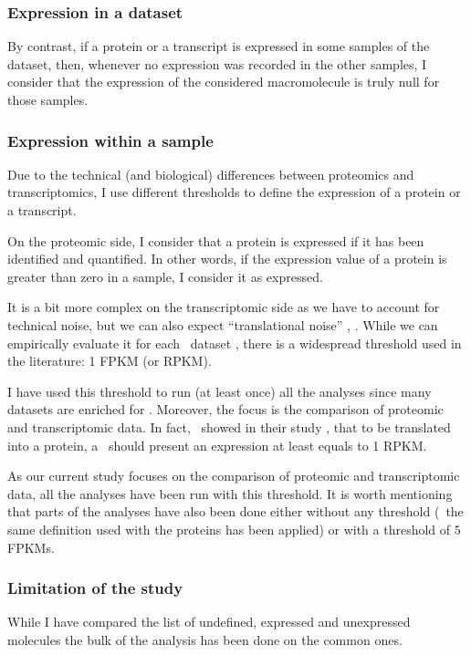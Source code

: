 \subsubsection{Expression in a dataset}
\label{subsec:ExpressedOrNot--expDataset}
By contrast, if a protein or a transcript is expressed in some samples of the
dataset, then, whenever no expression was recorded in the other
samples, I consider that the expression of the considered macromolecule is truly
null for those samples.

\subsubsection{Expression within a sample}
Due to the technical (and biological) differences between proteomics and
transcriptomics, I use different thresholds to define the expression of a protein
or a transcript.

On the proteomic side, I consider that a protein is expressed if it has been
identified and quantified. In other words, if the expression value of a protein
is greater than zero in a sample, I consider it as expressed.

\label{subsubsec:exprTrans}
It is a bit more complex on the transcriptomic side as we have to account for
technical noise, but we can also expect ``translational noise'' \citep{rnaseq-2009},
\citep{lowNoiseLimit}.
While we can empirically evaluate it for each \Rnaseq\ dataset \citep{ramskoldan:2009},
there is a widespread threshold used in the literature:
1 \gls{FPKM} (or \gls{RPKM}).

I have used this threshold to run (at least once) all the analyses since
many datasets are enriched for \mRNAs. Moreover, the 
focus is the comparison of proteomic and
transcriptomic data. In fact,~\citet{Hebenstreit:2011} showed in their study
, that to be translated into a protein,
a \mRNA\ should present an expression at least equals to 1 \gls{RPKM}.

As our current study focuses on the comparison of proteomic and transcriptomic
data, all the analyses have been run with this threshold. It is worth mentioning
that parts of the analyses have also been done either without
any threshold (\ie\ the same definition used with the proteins has been applied)
or with a threshold of $5$ \glspl{FPKM}.

\subsubsection{Limitation of the study}
While I have compared the list of undefined, expressed and unexpressed molecules
the bulk of the analysis has been done on the common ones.

